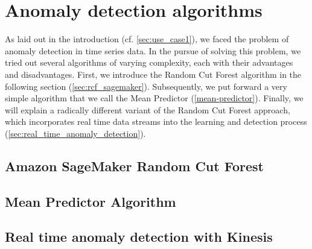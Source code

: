 \section{Anomaly detection algorithms}
\label{sec:anomaly_detection_intro}

As laid out in the introduction (cf. \ref{sec:use_case1}), we faced the problem of anomaly detection in time series data. In the pursue of solving this problem, we tried out several algorithms of varying complexity, each with their advantages and disadvantages. First, we introduce the Random Cut Forest algorithm in the following section (\ref{sec:rcf_sagemaker}). Subsequently, we put forward a very simple algorithm that we call the Mean Predictor (\ref{mean-predictor}). Finally, we will explain a radically different variant of the Random Cut Forest approach, which incorporates real time data streams into the learning and detection process (\ref{sec:real_time_anomaly_detection}).

\subsection{Amazon SageMaker Random Cut Forest}
    
    \FloatBarrier
    
\subsection{Mean Predictor Algorithm}
    

\subsection{Real time anomaly detection with Kinesis}
    